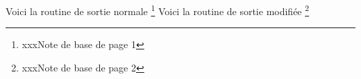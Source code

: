 \documentclass{article}
\begin{document}
Voici la routine de sortie normale%
\footnote{xxxNote de base de page 1}\newpage
\makeatletter
\gdef \@makecol {%
   \ifvoid\footins
     \setbox\@outputbox \box\@cclv
   \else
     \setbox\@outputbox \vbox {%
       \boxmaxdepth \@maxdepth
       \unvbox \@cclv
       \vskip \skip\footins
       \color@begingroup
         \normalcolor
         \hbox{\kern 2cm \vbox{\footnoterule}}%
         \unvbox \footins
       \color@endgroup
       }%
   \fi
   \let\@elt\relax
   \xdef\@freelist{\@freelist\@midlist}%
   \global \let \@midlist \@empty
   \@combinefloats
   \ifvbox\@kludgeins
     \@makespecialcolbox
   \else
     \setbox\@outputbox \vbox to\@colht {%
       \@texttop
       \dimen@ \dp\@outputbox
       \unvbox \@outputbox
       \vskip -\dimen@
       \@textbottom
       }%
   \fi
   \global \maxdepth \@maxdepth
}
\makeatother
Voici la routine de sortie modifiée%
\footnote{xxxNote de base de page 2}
\end{document}
